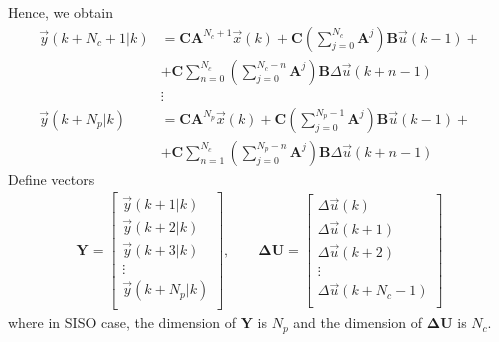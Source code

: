 \documentclass[11pt,a4paper,oneside]{book}
\numberwithin{equation}{section}
\theoremstyle{it}
\theoremstyle{definition}
\begin{document}
Hence, we obtain
\begin{equation}\label{eq13}
	\begin{aligned}
		\vec{y}(k+N_c+1|k) &= \mathbf{C}\mathbf{A}^{N_c+1}\vec{x}(k) 
		+\mathbf{C}\left(\sum_{j=0}^{N_c}\mathbf{A}^j\right)\mathbf{B}\vec{u}(k-1)+
		 \\[6pt] 
		&+\mathbf{C}\sum_{n=0}^{N_c}\left(\sum_{j=0}^{N_c-n}\mathbf{A}^j\right)\mathbf{B}\Delta\vec{u}(k+n-1)
		 \\[6pt]
		&\vdots \\[6pt]
		\vec{y}(k+N_p|k) &= \mathbf{C}\mathbf{A}^{N_p}\vec{x}(k) 
		+\mathbf{C}\left(\sum_{j=0}^{N_p-1}\mathbf{A}^j\right)\mathbf{B}\vec{u}(k-1)+
		 \\[6pt] 
		&+\mathbf{C}\sum_{n=1}^{N_c}\left(\sum_{j=0}^{N_p-n}\mathbf{A}^j\right)\mathbf{B}\Delta\vec{u}(k+n-1)
	\end{aligned}
\end{equation}
Define vectors
\begin{equation}\label{eq14}
	\begin{aligned}
		\mathbf{Y}= \begin{bmatrix}
			\vec{y}(k+1|k) \\[6pt]
			\vec{y}(k+2|k) \\[6pt]
			\vec{y}(k+3|k) \\[6pt]
			\vdots \\[6pt]
			\vec{y}(k+N_p|k) \\[6pt]
		\end{bmatrix}, \qquad
		\mathbf{\Delta U}= \begin{bmatrix}
			\Delta\vec{u}(k) \\[6pt]
			\Delta\vec{u}(k+1) \\[6pt]
			\Delta\vec{u}(k+2) \\[6pt]
			\vdots \\[6pt]
			\Delta\vec{u}(k+N_c-1) \\[6pt]
		\end{bmatrix}
	\end{aligned}
\end{equation}
where in SISO case, the dimension of $\mathbf{Y}$ is $N_p$ and the dimension of 
$\mathbf{\Delta U}$ is $N_c$. \\
\end{document}

